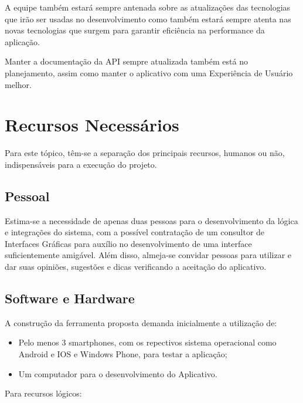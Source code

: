 \documentclass[
	article,			%
	11pt,				%
	oneside,			%
	a4paper,			%
	english,			%
	brazil,				%
	sumario=tradicional
	]{abntex2}
\begin{document}
A equipe também estará sempre antenada sobre as atualizações das tecnologias que irão ser usadas no desenvolvimento como também estará sempre atenta nas novas tecnologias que surgem para garantir eficiência na performance da aplicação.

Manter a documentação da API sempre atualizada também está no planejamento, assim como manter o aplicativo com uma Experiência de Usuário melhor.

\section{Recursos Necessários}

Para este tópico, têm-se a separação dos principais recursos, humanos ou não, indispensáveis para a execução do projeto.

\subsection{Pessoal}

Estima-se a necessidade de apenas duas pessoas para o desenvolvimento da lógica e integrações do sistema, com a possível contratação de um consultor de Interfaces Gráficas para auxílio no desenvolvimento de uma interface suficientemente amigável. Além disso, almeja-se convidar pessoas para utilizar e dar suas opiniões, sugestões e dicas verificando a aceitação do aplicativo. 

\subsection{Software e Hardware}

A construção da ferramenta proposta demanda inicialmente a utilização de:

\begin{itemize}
	\item Pelo menos 3 smartphones, com os repectivos sistema operacional como Android e IOS e Windows Phone, para testar a aplicação;
	
	\item Um computador para o desenvolvimento do Aplicativo.
\end{itemize}

Para recursos lógicos:
\end{document}
